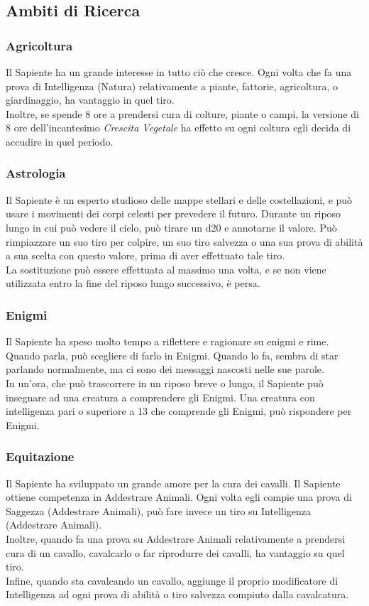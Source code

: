 \subsection{Ambiti di Ricerca}

\subsubsection{Agricoltura}
Il Sapiente ha un grande interesse in tutto ciò che cresce. Ogni volta che fa una prova di Intelligenza (Natura) relativamente a piante, fattorie, agricoltura, o giardinaggio, ha vantaggio in quel tiro. \\
Inoltre, se spende 8 ore a prendersi cura di colture, piante o campi, la versione di 8 ore dell'incantesimo \textit{Crescita Vegetale} ha effetto su ogni coltura egli decida di accudire in quel periodo.

\subsubsection{Astrologia}
Il Sapiente è un esperto studioso delle mappe stellari e delle costellazioni, e può usare i movimenti dei corpi celesti per prevedere il futuro. Durante un riposo lungo in cui può vedere il cielo, può tirare un d20 e annotarne il valore. Può rimpiazzare un suo tiro per colpire, un suo tiro salvezza o una sua prova di abilità a sua scelta con questo valore, prima di aver effettuato tale tiro.\\
La sostituzione può essere effettuata al massimo una volta, e se non viene utilizzata entro la fine del riposo lungo successivo, è persa.

\subsubsection{Enigmi}
Il Sapiente ha speso molto tempo a riflettere e ragionare su enigmi e rime. Quando parla, può scegliere di farlo in Enigmi. Quando lo fa, sembra di star parlando normalmente, ma ci sono dei messaggi nascosti nelle sue parole. \\
In un'ora, che può trascorrere in un riposo breve o lungo, il Sapiente può insegnare ad una creatura a comprendere gli Enigmi. Una creatura con intelligenza pari o superiore a 13 che comprende gli Enigmi, può rispondere per Enigmi.

\subsubsection{Equitazione}
Il Sapiente ha sviluppato un grande amore per la cura dei cavalli. Il Sapiente ottiene competenza in Addestrare Animali. Ogni volta egli compie una prova di Saggezza (Addestrare Animali), può fare invece un tiro su Intelligenza (Addestrare Animali).\\
Inoltre, quando fa una prova su Addestrare Animali relativamente a prendersi cura di un cavallo, cavalcarlo o far riprodurre dei cavalli, ha vantaggio su quel tiro.\\
Infine, quando sta cavalcando un cavallo, aggiunge il proprio modificatore di Intelligenza ad ogni prova di abilità o tiro salvezza compiuto dalla cavalcatura.

